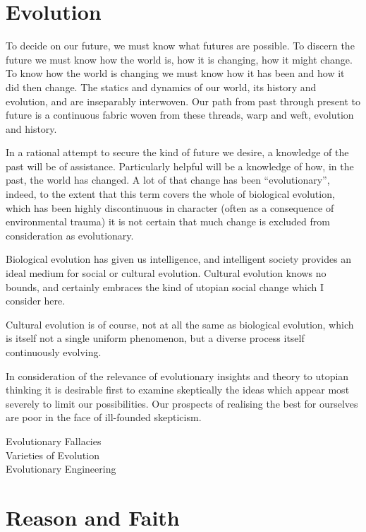 \section{Evolution}

To decide on our future, we must know what futures are possible.
To discern the future we must know how the world is, how it is changing, how it might change.
To know how the world is changing we must know how it has been and how it did then change.
The statics and dynamics of our world, its history and evolution, and are inseparably interwoven.
Our path from past through present to future is a continuous fabric woven from these threads, warp and weft, evolution and history.

In a rational attempt to secure the kind of future we desire, a knowledge of the past will be of assistance.
Particularly helpful will be a knowledge of how, in the past, the world has changed.
A lot of that change has been ``evolutionary'', indeed, to the extent that this term covers the whole of biological evolution, which has been highly discontinuous in character (often as a consequence of environmental trauma) it is not certain that much change is excluded from consideration as evolutionary.

Biological evolution has given us intelligence, and intelligent society provides an ideal medium for social or cultural evolution.
Cultural evolution knows no bounds, and certainly embraces the kind of utopian social change which I consider here.

Cultural evolution is of course, not at all the same as biological evolution, which is itself not a single uniform phenomenon, but a diverse process itself continuously evolving.

In consideration of the relevance of evolutionary insights and theory to utopian thinking it is desirable first to examine skeptically the ideas which appear most severely to limit our possibilities.
Our prospects of realising the best for ourselves are poor in the face of ill-founded skepticism.

\begin{description}
\item[Evolutionary Fallacies]
\item[Varieties of Evolution]
\item[Evolutionary Engineering] 
\end{description}

\section{Reason and Faith}

